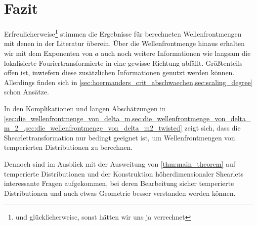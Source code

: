 \section{Fazit} %
\label{sec:fazit_für_mathematiker}


Erfreulicherweise\footnote{und glücklicherweise, sonst hätten wir uns ja verrechnet} stimmen die Ergebnisse für berechneten Wellenfrontmengen mit denen in der Literatur überein. Über die Wellenfrontmenge hinaus erhalten wir mit dem Exponenten von $a$ auch noch weitere Informationen wie langsam die lokalisierte Fouriertransformierte in eine gewisse Richtung abfällt. Größtenteils offen ist, inwiefern diese zusätzlichen Informationen genutzt werden können. Allerdings finden sich in \cref{sec:hoermanders_crit_abschwaechen,sec:scaling_degree} schon Ansätze.

In den Komplikationen und langen Abschätzungen in \cref{sec:die_wellenfrontmenge_von_delta_m,sec:die_wellenfrontmenge_von_delta_m_2_,sec:die_wellenfrontmenge_von_delta_m2_twisted} zeigt sich, dass die Shearlettransformation nur bedingt geeignet ist, um Wellenfrontmengen von temperierten Distributionen zu berechnen.

Dennoch sind im Ausblick mit der Ausweitung von \cref{thm:main_theorem} auf temperierte Distributionen und  der Konstruktion höherdimensionaler Shearlets interessante Fragen aufgekommen, bei deren Bearbeitung sicher temperierte Distributionen und auch etwas Geometrie besser verstanden werden können.

